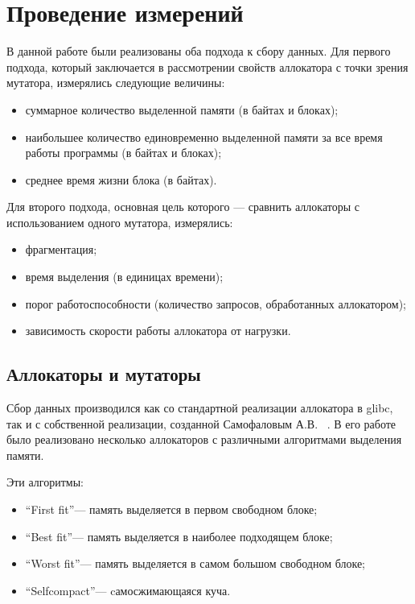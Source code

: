 \documentclass[12pt,a4paper]{article}
\begin{document}
   \newpage
   \section{Проведение измерений}
   В данной работе были реализованы оба подхода к сбору данных. Для первого подхода, который заключается в рассмотрении свойств аллокатора с точки зрения мутатора, измерялись следующие величины:
   \begin{itemize}
      \item суммарное количество выделенной памяти (в байтах и блоках);
      \item наибольшее количество единовременно выделенной памяти за все время работы программы (в байтах и блоках);
      \item среднее время жизни блока (в байтах).
   \end{itemize}
      
   Для второго подхода, основная цель которого --- сравнить аллокаторы с использованием одного мутатора, 
   измерялись:
   \begin{itemize}
         \item фрагментация; 
         \item время выделения (в единицах времени);
         \item порог работоспособности (количество запросов, обработанных аллокатором);
         \item зависимость скорости работы аллокатора от нагрузки.
   \end{itemize}
      
   \subsection{Аллокаторы и мутаторы}
   
   Сбор данных производился как со стандартной реализации аллокатора в glibc, так и с собственной реализации,
   созданной Самофаловым А.В. ~\cite{samofal}. В его работе было реализовано несколько аллокаторов с различными алгоритмами
   выделения памяти.
   
   Эти алгоритмы:
   \begin{itemize}
      \item \textquotedblleft First fit\textquotedblright --- память выделяется в первом свободном блоке;
      \item \textquotedblleft Best fit\textquotedblright --- память выделяется в наиболее подходящем блоке;
      \item \textquotedblleft Worst fit\textquotedblright --- память выделяется в самом большом свободном блоке;
      \item \textquotedblleft Selfcompact\textquotedblright --- cамосжимающаяся куча.
   \end{itemize}
   
\end{document}
